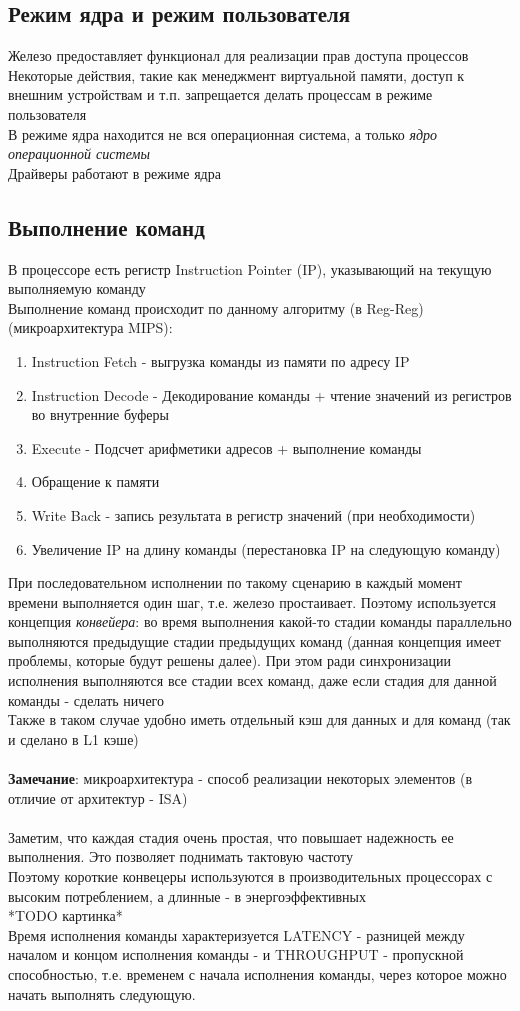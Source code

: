 \documentclass[12pt]{article}
\begin{document}
\subsection{Режим ядра и режим пользователя}
Железо предоставляет функционал для реализации прав доступа процессов\\
Некоторые действия, такие как менеджмент виртуальной памяти, доступ к внешним устройствам и т.п. запрещается делать процессам в режиме пользователя\\
В режиме ядра находится не вся операционная система, а только \textit{ядро операционной системы}\\
Драйверы работают в режиме ядра
\subsection{Выполнение команд}
В процессоре есть регистр Instruction Pointer (IP), указывающий на текущую выполняемую команду\\
Выполнение команд происходит по данному алгоритму (в Reg-Reg) (микроархитектура MIPS):
\begin{enumerate}
    \item Instruction Fetch - выгрузка команды из памяти по адресу IP
    \item Instruction Decode - Декодирование команды + чтение значений из регистров во внутренние буферы
    \item Execute - Подсчет арифметики адресов + выполнение команды 
    \item Обращение к памяти 
    \item Write Back - запись результата в регистр значений (при необходимости)
    \item Увеличение IP на длину команды (перестановка IP на следующую команду)
\end{enumerate}
При последовательном исполнении по такому сценарию в каждый момент времени выполняется один шаг, т.е. железо простаивает. Поэтому используется концепция \textit{конвейера}: во время выполнения какой-то стадии команды параллельно выполняются предыдущие стадии предыдущих команд (данная концепция имеет проблемы, которые будут решены далее). При этом ради синхронизации исполнения выполняются все стадии всех команд, даже если стадия для данной команды - сделать ничего\\
Также в таком случае удобно иметь отдельный кэш для данных и для команд (так и сделано в L1 кэше)\\\\
\textbf{Замечание}: микроархитектура - способ реализации некоторых элементов (в отличие от архитектур - ISA)\\\\
Заметим, что каждая стадия очень простая, что повышает надежность ее выполнения. Это позволяет поднимать тактовую частоту\\
Поэтому короткие конвецеры используются в производительных процессорах с высоким потреблением, а длинные - в энергоэффективных\\
*TODO картинка*\\
Время исполнения команды характеризуется LATENCY - разницей между началом и концом исполнения команды - и THROUGHPUT - пропускной способностью, т.е. временем с начала исполнения команды, через которое можно начать выполнять следующую.
\end{document}
